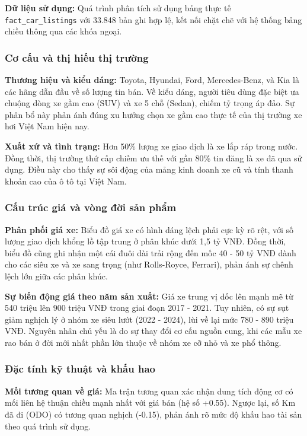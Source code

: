 \textbf{Dữ liệu sử dụng:} Quá trình phân tích sử dụng bảng thực tế \texttt{fact\_car\_listings} với 33.848 bản ghi hợp lệ, kết nối chặt chẽ với hệ thống bảng chiều thông qua các khóa ngoại.


\subsubsection{Cơ cấu và thị hiếu thị trường}

\textbf{Thương hiệu và kiểu dáng:} Toyota, Hyundai, Ford, Mercedes-Benz, và Kia là các hãng dẫn đầu về số lượng tin bán. Về kiểu dáng, người tiêu dùng đặc biệt ưa chuộng dòng xe gầm cao (SUV) và xe 5 chỗ (Sedan), chiếm tỷ trọng áp đảo. Sự phân bổ này phản ánh đúng xu hướng chọn xe gầm cao thực tế của thị trường xe hơi Việt Nam hiện nay.

\textbf{Xuất xứ và tình trạng:} Hơn 50\% lượng xe giao dịch là xe lắp ráp trong nước. Đồng thời, thị trường thứ cấp chiếm ưu thế với gần 80\% tin đăng là xe đã qua sử dụng. Điều này cho thấy sự sôi động của mảng kinh doanh xe cũ và tính thanh khoản cao của ô tô tại Việt Nam.


\subsubsection{Cấu trúc giá và vòng đời sản phẩm}

\textbf{Phân phối giá xe:} Biểu đồ giá xe có hình dáng lệch phải cực kỳ rõ rệt, với số lượng giao dịch khổng lồ tập trung ở phân khúc dưới 1,5 tỷ VNĐ. Đồng thời, biểu đồ cũng ghi nhận một cái đuôi dài trải rộng đến mốc 40 - 50 tỷ VNĐ dành cho các siêu xe và xe sang trọng (như Rolls-Royce, Ferrari), phản ánh sự chênh lệch lớn giữa các phân khúc.

\textbf{Sự biến động giá theo năm sản xuất:} Giá xe trung vị dốc lên mạnh mẽ từ 540 triệu lên 900 triệu VNĐ trong giai đoạn 2017 - 2021. Tuy nhiên, có sự sụt giảm nghịch lý ở nhóm xe siêu lướt (2022 - 2024), lùi về lại mức 780 - 890 triệu VNĐ. Nguyên nhân chủ yếu là do sự thay đổi cơ cấu nguồn cung, khi các mẫu xe rao bán ở đời mới nhất phần lớn thuộc về nhóm xe cỡ nhỏ và xe phổ thông.


\subsubsection{Đặc tính kỹ thuật và khấu hao}

\textbf{Mối tương quan về giá:} Ma trận tương quan xác nhận dung tích động cơ có mối liên hệ thuận chiều mạnh nhất với giá bán (hệ số +0.55). Ngược lại, số Km đã đi (ODO) có tương quan nghịch (-0.15), phản ánh rõ mức độ khấu hao tài sản theo quá trình sử dụng.


